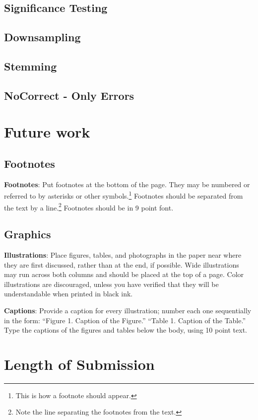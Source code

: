 \documentclass[11pt,letterpaper]{article}
\begin{document}
\subsection{Significance Testing}
\subsection{Downsampling}
\subsection{Stemming}
\subsection{NoCorrect - Only Errors}


\section{Future work}

\subsection{Footnotes}

{\bf Footnotes}: Put footnotes at the bottom of the page. They may
be numbered or referred to by asterisks or other
symbols.\footnote{This is how a footnote should appear.} Footnotes
should be separated from the text by a line.\footnote{Note the
line separating the footnotes from the text.}  Footnotes should be in 9 point font.

\subsection{Graphics}

{\bf Illustrations}: Place figures, tables, and photographs in the
paper near where they are first discussed, rather than at the end, if
possible.  Wide illustrations may run across both columns and should be placed at
the top of a page. Color illustrations are discouraged, unless you have verified that 
they will be understandable when printed in black ink.

{\bf Captions}: Provide a caption for every illustration; number each one
sequentially in the form:  ``Figure 1. Caption of the Figure.'' ``Table 1.
Caption of the Table.''  Type the captions of the figures and 
tables below the body, using 10 point text.  

\section{Length of Submission}
\label{sec:length}
\end{document}
